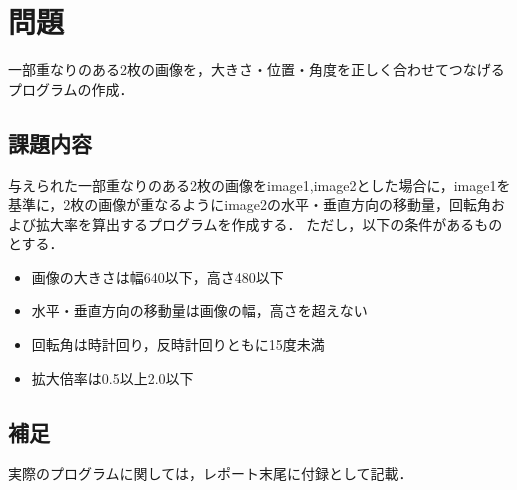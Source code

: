 \section{問題}
一部重なりのある2枚の画像を，大きさ・位置・角度を正しく合わせてつなげるプログラムの作成．

\subsection{課題内容}
与えられた一部重なりのある2枚の画像をimage1,image2とした場合に，image1を基準に，2枚の画像が重なるようにimage2の水平・垂直方向の移動量，回転角および拡大率を算出するプログラムを作成する．
ただし，以下の条件があるものとする．
\begin{itemize}
    \item 画像の大きさは幅640以下，高さ480以下
    \item 水平・垂直方向の移動量は画像の幅，高さを超えない
    \item 回転角は時計回り，反時計回りともに15度未満
    \item 拡大倍率は0.5以上2.0以下
\end{itemize}

\subsection{補足}
実際のプログラムに関しては，レポート末尾に付録として記載．
